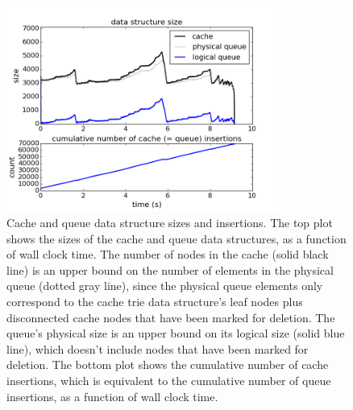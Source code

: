 \begin{figure}[t!]
\begin{center}
\includegraphics[width=0.8\textwidth]{figs/ela-queue-cache-size-insertions.png}
\end{center}
\caption{Cache and queue data structure sizes and insertions.
%
The top plot shows the sizes of the cache and queue data structures,
as a function of wall clock time.
%
The number of nodes in the cache (solid black line) is an
upper bound on the number of elements in the physical queue
(dotted gray line), since the physical queue elements only
correspond to the cache trie data structure's leaf nodes
plus disconnected cache nodes that have been marked for deletion.
%
The queue's physical size is an upper bound on its
logical size (solid blue line), which doesn't include nodes
that have been marked for deletion.
%
The bottom plot shows the cumulative number of cache insertions,
which is equivalent to the cumulative number of queue insertions,
as a function of wall clock time.
}
\label{fig:queue-cache-size-insertions}
\end{figure}

